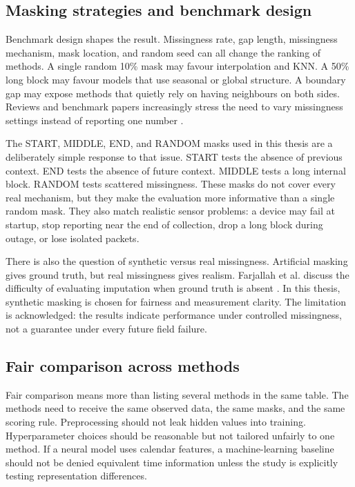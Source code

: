 \subsection{Masking strategies and benchmark design}

Benchmark design shapes the result. Missingness rate, gap length, missingness mechanism, mask location, and random seed can all change the ranking of methods. A single random 10\% mask may favour interpolation and KNN. A 50\% long block may favour models that use seasonal or global structure. A boundary gap may expose methods that quietly rely on having neighbours on both sides. Reviews and benchmark papers increasingly stress the need to vary missingness settings instead of reporting one number \cite{Miao2023AnES,Toye2025BenchmarkingMD,Zahmatkesh2026SpatioTemporalMD}.

The START, MIDDLE, END, and RANDOM masks used in this thesis are a deliberately simple response to that issue. START tests the absence of previous context. END tests the absence of future context. MIDDLE tests a long internal block. RANDOM tests scattered missingness. These masks do not cover every real mechanism, but they make the evaluation more informative than a single random mask. They also match realistic sensor problems: a device may fail at startup, stop reporting near the end of collection, drop a long block during outage, or lose isolated packets.

There is also the question of synthetic versus real missingness. Artificial masking gives ground truth, but real missingness gives realism. Farjallah et al. discuss the difficulty of evaluating imputation when ground truth is absent \cite{Farjallah2025EvaluationOM}. In this thesis, synthetic masking is chosen for fairness and measurement clarity. The limitation is acknowledged: the results indicate performance under controlled missingness, not a guarantee under every future field failure.

\subsection{Fair comparison across methods}

Fair comparison means more than listing several methods in the same table. The methods need to receive the same observed data, the same masks, and the same scoring rule. Preprocessing should not leak hidden values into training. Hyperparameter choices should be reasonable but not tailored unfairly to one method. If a neural model uses calendar features, a machine-learning baseline should not be denied equivalent time information unless the study is explicitly testing representation differences.

